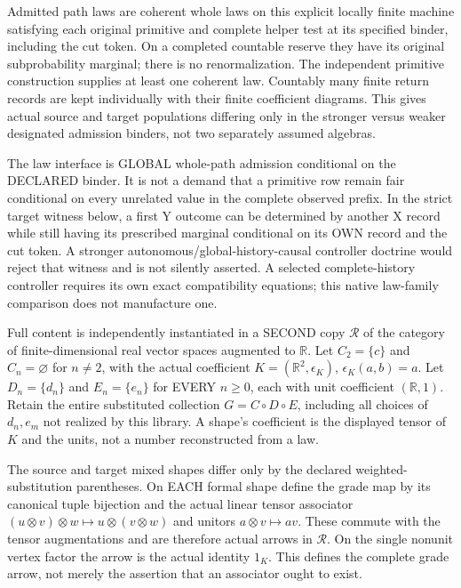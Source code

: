 \documentclass{article}
\begin{document}
Admitted path laws are coherent whole laws on this explicit locally finite machine satisfying each original primitive and complete helper test at its specified binder, including the cut token. On a completed countable reserve they have its original subprobability marginal; there is no renormalization. The independent primitive construction supplies at least one coherent law. Countably many finite return records are kept individually with their finite coefficient diagrams. This gives actual source and target populations differing only in the stronger versus weaker designated admission binders, not two separately assumed algebras.

The law interface is GLOBAL whole-path admission conditional on the DECLARED binder. It is not a demand that a primitive row remain fair conditional on every unrelated value in the complete observed prefix. In the strict target witness below, a first Y outcome can be determined by another X record while still having its prescribed marginal conditional on its OWN record and the cut token. A stronger autonomous/global-history-causal controller doctrine would reject that witness and is not silently asserted. A selected complete-history controller requires its own exact compatibility equations; this native law-family comparison does not manufacture one.

Full content is independently instantiated in a SECOND copy $\mathcal R$ of the category of finite-dimensional real vector spaces augmented to $\mathbb R$. Let $C_2=\{c\}$ and $C_n=\varnothing$ for $n\ne2$, with the actual coefficient $K=(\mathbb R^2,\epsilon_K)$, $\epsilon_K(a,b)=a$. Let $D_n=\{d_n\}$ and $E_n=\{e_n\}$ for EVERY $n\geq0$, each with unit coefficient $(\mathbb R,1)$. Retain the entire substituted collection $G=C\circ D\circ E$, including all choices of $d_n,e_m$ not realized by this library. A shape's coefficient is the displayed tensor of $K$ and the units, not a number reconstructed from a law.

The source and target mixed shapes differ only by the declared weighted-substitution parentheses. On EACH formal shape define the grade map by its canonical tuple bijection and the actual linear tensor associator $(u\otimes v)\otimes w\mapsto u\otimes(v\otimes w)$ and unitors $a\otimes v\mapsto av$. These commute with the tensor augmentations and are therefore actual arrows in $\mathcal R$. On the single nonunit vertex factor the arrow is the actual identity $1_K$. This defines the complete grade arrow, not merely the assertion that an associator ought to exist.
\end{document}
